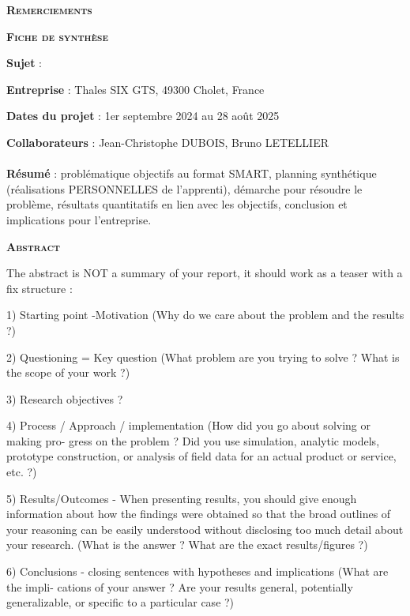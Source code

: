 \documentclass[a4paper]{article}
\begin{document}
\newpage
\large{\textsc{\textbf{Remerciements}}}
\vspace*{0.5cm}

\newpage
\vspace*{1cm}
\tableofcontents

\newpage
\large{\textsc{\textbf{Fiche de synthèse}}}
\vspace*{0.5cm}

\textbf{Sujet} : \Subject

\textbf{Entreprise} : Thales SIX GTS, 49300 Cholet, France

\textbf{Dates du projet} : 1er septembre 2024 au 28 août 2025

\textbf{Collaborateurs} : Jean-Christophe DUBOIS, Bruno LETELLIER \\\\
\textbf{Résumé} : problématique objectifs au format SMART, planning synthétique (réalisations PERSONNELLES de l'apprenti), démarche pour résoudre le problème, résultats quantitatifs en lien avec les objectifs, conclusion et implications pour l'entreprise.

\newpage
\large{\textsc{\textbf{Abstract}}}
\vspace*{0.5cm}

The abstract is NOT a summary of your report, it should work as a teaser with a fix
structure :

1) Starting point -Motivation (Why do we care about the problem and the results ?)

2) Questioning = Key question (What problem are you trying to solve ? What is the scope
of your work ?)

3) Research objectives ?

4) Process / Approach / implementation (How did you go about solving or making pro-
gress on the problem ? Did you use simulation, analytic models, prototype construction,
or analysis of field data for an actual product or service, etc. ?)

5) Results/Outcomes - When presenting results, you should give enough information
about how the findings were obtained so that the broad outlines of your reasoning can
be easily understood without disclosing too much detail about your research. (What is the
answer ? What are the exact results/figures ?)

6) Conclusions - closing sentences with hypotheses and implications (What are the impli-
cations of your answer ? Are your results general, potentially generalizable, or specific to
a particular case ?)
\end{document}
